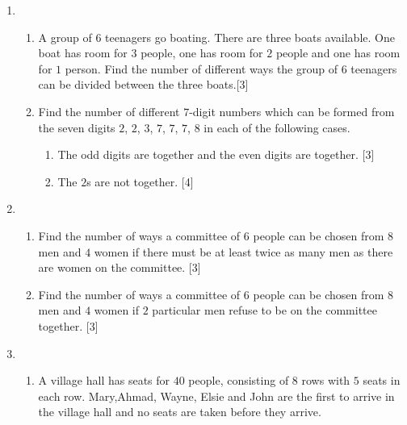 \begin{enumerate}

\item  \begin{enumerate}[label=(\roman*)]
	\item A group of $6$ teenagers go boating. There are three boats available. One boat has room for $3$ people, one has room for $2$ people and one has room for $1$ person. Find the number of different ways the group of 6 teenagers can be divided between the three boats.\hfill [3]
	\item Find the number of different $7$-digit numbers which can be formed from the seven digits $2$, $2$, $3$, $7$, $7$, $7$, $8$ in each of the following cases.
	\begin{enumerate}[label=(\alph*)]
		\item The odd digits are together and the even digits are together. \hfill [3]
		\item The $2$s are not together. \hfill[4]
	\end{enumerate}
\end{enumerate}



\item  \begin{enumerate}[label=(\roman*)]
	\item Find the number of ways a committee of $6$ people can be chosen from $8$ men and $4$ women if there must be at least twice as many men as there are women on the committee. \hfill[3]
	\item Find the number of ways a committee of $6$ people can be chosen from $8$ men and $4$ women if $2$ particular men refuse to be on the committee together. \hfill[3]

\end{enumerate}


\item \begin{enumerate}[label=(\roman*)]
	\item A village hall has seats for $40$ people, consisting of $8$ rows with $5$ seats in each row. Mary,Ahmad, Wayne, Elsie and John are the first to arrive in the village hall and no seats are taken
	before they arrive.
	

\end{enumerate}
\end{enumerate}
